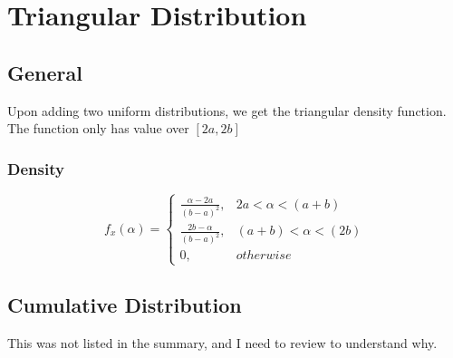 \section*{Triangular Distribution}

\subsection*{General}
Upon adding two uniform distributions, we get the triangular density function. The function only has value over $[2a,2b]$

\subsubsection*{Density}
\[ f_x(\alpha)=
  \begin{cases} 
    \frac{\alpha-2a}{(b-a)^2}, & 2a<\alpha<(a+b) \\
    \frac{2b-\alpha}{(b-a)^2}, & (a+b)<\alpha<(2b) \\
    0,                         & otherwise
  \end{cases}
\]

\subsection*{Cumulative Distribution}
This was not listed in the summary, and I need to review to understand why.
    

